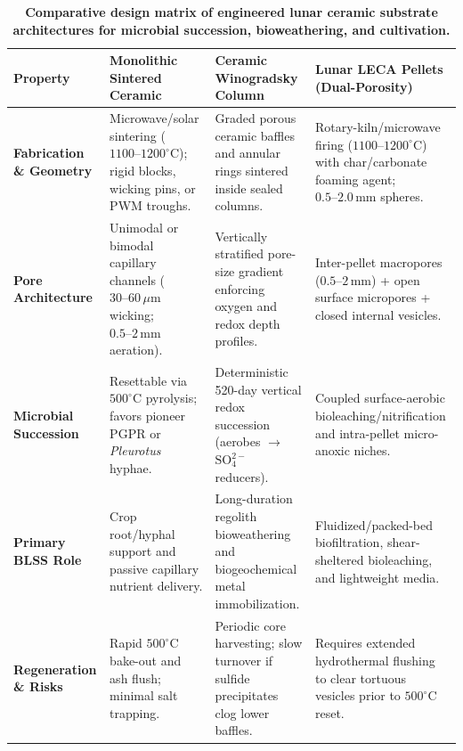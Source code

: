 \begin{table}[t!]
\centering
\caption{\textbf{Comparative design matrix of engineered lunar ceramic substrate architectures for microbial succession, bioweathering, and cultivation.}}
\label{tab:ceramic_substrate_variants}
\footnotesize
\begin{tabularx}{\textwidth}{>{\raggedright\arraybackslash}p{2.6cm} >{\raggedright\arraybackslash}X >{\raggedright\arraybackslash}X >{\raggedright\arraybackslash}X}
\toprule
\textbf{Property} & \textbf{Monolithic Sintered Ceramic} & \textbf{Ceramic Winogradsky Column} & \textbf{Lunar LECA Pellets (Dual-Porosity)} \\
\midrule
\textbf{Fabrication \& Geometry} & Microwave/solar sintering ($1100\text{--}1200^\circ\mathrm{C}$); rigid blocks, wicking pins, or PWM troughs. & Graded porous ceramic baffles and annular rings sintered inside sealed columns. & Rotary-kiln/microwave firing ($1100\text{--}1200^\circ\mathrm{C}$) with char/carbonate foaming agent; $0.5\text{--}2.0\,\mathrm{mm}$ spheres. \\
\textbf{Pore Architecture} & Unimodal or bimodal capillary channels ($30\text{--}60\,\mu\mathrm{m}$ wicking; $0.5\text{--}2\,\mathrm{mm}$ aeration). & Vertically stratified pore-size gradient enforcing oxygen and redox depth profiles. & Inter-pellet macropores ($0.5\text{--}2\,\mathrm{mm}$) + open surface micropores + closed internal vesicles. \\
\textbf{Microbial Succession} & Resettable via $500^\circ\mathrm{C}$ pyrolysis; favors pioneer PGPR or \textit{Pleurotus} hyphae. & Deterministic 520-day vertical redox succession (aerobes $\to$ $\mathrm{SO}_4^{2-}$ reducers). & Coupled surface-aerobic bioleaching/nitrification and intra-pellet micro-anoxic niches. \\
\textbf{Primary BLSS Role} & Crop root/hyphal support and passive capillary nutrient delivery. & Long-duration regolith bioweathering and biogeochemical metal immobilization. & Fluidized/packed-bed biofiltration, shear-sheltered bioleaching, and lightweight media. \\
\textbf{Regeneration \& Risks} & Rapid $500^\circ\mathrm{C}$ bake-out and ash flush; minimal salt trapping. & Periodic core harvesting; slow turnover if sulfide precipitates clog lower baffles. & Requires extended hydrothermal flushing to clear tortuous vesicles prior to $500^\circ\mathrm{C}$ reset. \\
\bottomrule
\end{tabularx}
\end{table}

